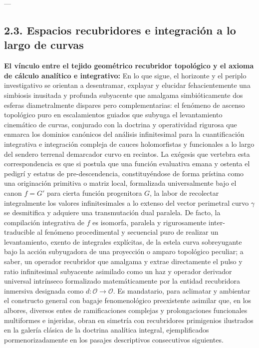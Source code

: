 \documentclass[11pt,a4paper]{article}
\theoremstyle{definition}
\theoremstyle{remark}
\numberwithin{equation}{section}
\begin{document}
---

\subsection{2.3. Espacios recubridores e integración a lo largo de curvas}

\textbf{El vínculo entre el tejido geométrico recubridor topológico y el axioma de cálculo analítico e integrativo:}
En lo que sigue, el horizonte y el periplo investigativo se orientan a desentramar, explayar y elucidar fehacientemente una simbiosis inusitada y profunda subyacente que amalgama simbióticamente dos esferas diametralmente dispares pero complementarias: el fenómeno de ascenso topológico puro en escalamientos guiados que subyuga el levantamiento cinemático de curvas, conjurado con la doctrina y operatividad rigurosa que enmarca los dominios canónicos del análisis infinitesimal para la cuantificación integrativa e integración compleja de cauces holomorfistas y funcionales a lo largo del sendero terrenal demarcador curvo en recintos.
La exégesis que vertebra esta correspondencia es que si postula que una función evaluativa emana y ostenta el pedigrí y estatus de pre-descendencia, constituyéndose de forma prístina como una originación primitiva o matriz local, formalizada universalmente bajo el canon $f=G'$ para cierta función progenitora $G$, la labor de recolectar integralmente los valores infinitesimales a lo extenso del vector perimetral curvo $\gamma$ se desmitifica y adquiere una transmutación dual paralela.
De facto, la compilación integrativa de $f$ es isomorfa, paralela y rigurosamente inter-traducible al fenómeno procedimental y secuencial puro de realizar un levantamiento, exento de integrales explícitas, de la estela curva sobreyugante bajo la acción subyugadora de una proyección o amparo topológico peculiar; a saber, un operador recubridor que amalgama y extrae directamente el pulso y ratio infinitesimal subyacente asimilado como un haz y operador derivador universal intrínseco formalizado matemáticamente por la entidad recubridora inmersiva designada como $d: \mathcal{O} \to \mathcal{O}$.
Es mandatario, para aclimatar y ambientar el constructo general con bagaje fenomenológico preexistente asimilar que, en los albores, diversos entes de ramificaciones complejas y prolongaciones funcionales multiformes e injeridas, obran en simetría con recubridores primigenios ilustrados en la galería clásica de la doctrina analítica integral, ejemplificados pormenorizadamente en los pasajes descriptivos consecutivos siguientes.
\end{document}
